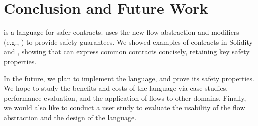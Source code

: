 \documentclass[dvipsnames, sigplan, screen]{acmart}
\begin{document}
\section{Conclusion and Future Work}

\langName is a language for safer contracts.
\langName uses the new flow abstraction and modifiers (e.g., ) to provide safety guarantees.
We showed examples of contracts in Solidity and \langName, showing that \langName can express common contracts concisely, retaining key safety properties.

In the future, we plan to implement the \langName language, and prove its safety properties.
We hope to study the benefits and costs of the language via case studies, performance evaluation, and the application of flows to other domains.
Finally, we would also like to conduct a user study to evaluate the usability of the flow abstraction and the design of the language. %



\end{document}
